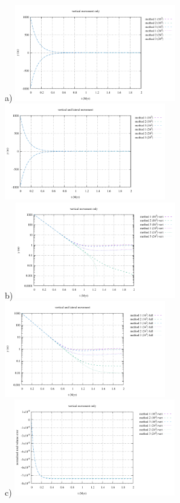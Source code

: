 \begin{center}
a) \includegraphics[width=7cm]{python_codes/fieldstone_54/images/exp1/elevation_vert.pdf}
   \includegraphics[width=7cm]{python_codes/fieldstone_54/images/exp1/elevation_full.pdf}\\
b) \includegraphics[width=7cm]{python_codes/fieldstone_54/images/exp1/elevation_log_vert.pdf}
   \includegraphics[width=7cm]{python_codes/fieldstone_54/images/exp1/elevation_log_full.pdf}\\
c) \includegraphics[width=7cm]{python_codes/fieldstone_54/images/exp1/volume_vert.pdf}

\end{center}
